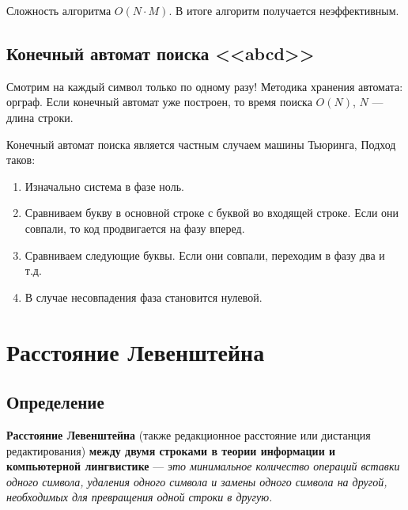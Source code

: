 Сложность алгоритма $O(N\cdot M)$. В итоге алгоритм получается неэффективным.
\subsection{Конечный автомат поиска <<abcd>>}
Смотрим на каждый символ только  по одному разу! Методика хранения автомата: орграф. Если конечный автомат уже построен, то время поиска $O(N)$, $N$ --- длина строки.

Конечный автомат поиска является частным случаем машины Тьюринга, Подход таков:
\begin{enumerate}
	\item Изначально система в фазе ноль.
	\item Сравниваем букву в основной строке с буквой во входящей строке. Если они совпали, то код продвигается на фазу вперед.
	\item Сравниваем следующие буквы. Если они совпали, переходим в фазу два и т.д.
	\item В случае несовпадения фаза становится нулевой.
\end{enumerate}

\section{Расстояние Левенштейна}
\subsection{Определение}
\textbf{Расстояние Левенштейна} (также редакционное расстояние или дистанция редактирования) \textbf{между двумя строками в теории информации и компьютерной лингвистике} --- \textit{это минимальное количество операций вставки одного символа, удаления одного символа и замены одного символа на другой, необходимых для превращения одной строки в другую.}

